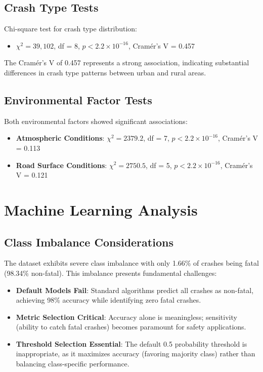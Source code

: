 \documentclass[12pt,a4paper]{article}
\begin{document}
\subsection{Crash Type Tests}

Chi-square test for crash type distribution:
\begin{itemize}
    \item $\chi^2 = 39,102$, df = 8, $p < 2.2 \times 10^{-16}$, Cramér's V = 0.457
\end{itemize}

The Cramér's V of 0.457 represents a strong association, indicating substantial differences in crash type patterns between urban and rural areas.

\subsection{Environmental Factor Tests}

Both environmental factors showed significant associations:
\begin{itemize}
    \item \textbf{Atmospheric Conditions}: $\chi^2 = 2379.2$, df = 7, $p < 2.2 \times 10^{-16}$, Cramér's V = 0.113
    \item \textbf{Road Surface Conditions}: $\chi^2 = 2750.5$, df = 5, $p < 2.2 \times 10^{-16}$, Cramér's V = 0.121
\end{itemize}

\section{Machine Learning Analysis}

\subsection{Class Imbalance Considerations}
The dataset exhibits severe class imbalance with only 1.66\% of crashes being fatal (98.34\% non-fatal). This imbalance presents fundamental challenges:

\begin{itemize}
    \item \textbf{Default Models Fail}: Standard algorithms predict all crashes as non-fatal, achieving 98\% accuracy while identifying zero fatal crashes.
    \item \textbf{Metric Selection Critical}: Accuracy alone is meaningless; sensitivity (ability to catch fatal crashes) becomes paramount for safety applications.
    \item \textbf{Threshold Selection Essential}: The default 0.5 probability threshold is inappropriate, as it maximizes accuracy (favoring majority class) rather than balancing class-specific performance.
\end{itemize}
\end{document}
